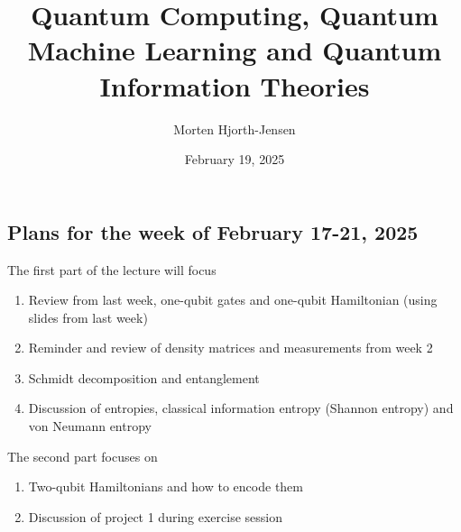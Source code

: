 \documentclass[%
oneside,                 %
final,                   %
10pt]{article}
\begin{document}

\newcommand{\exercisesection}[1]{\subsection*{#1}}






\title{Quantum Computing, Quantum Machine Learning and Quantum Information Theories}


\author{Morten Hjorth-Jensen}

\date{February 19, 2025
}

\subsection{Plans for the week of February 17-21, 2025}
\begin{block}{}
The first part of the lecture will focus
\begin{enumerate}
\item Review from last week, one-qubit gates and one-qubit Hamiltonian (using slides from last week)

\item Reminder and review of  density matrices and measurements from week 2

\item Schmidt decomposition and entanglement

\item Discussion of entropies, classical information entropy (Shannon entropy) and von Neumann entropy
\end{enumerate}

\noindent
The second part focuses on 
\begin{enumerate}
\item Two-qubit Hamiltonians and how to encode them

\item Discussion of project 1 during exercise session
\end{enumerate}

\noindent
\end{block}
\end{document}
